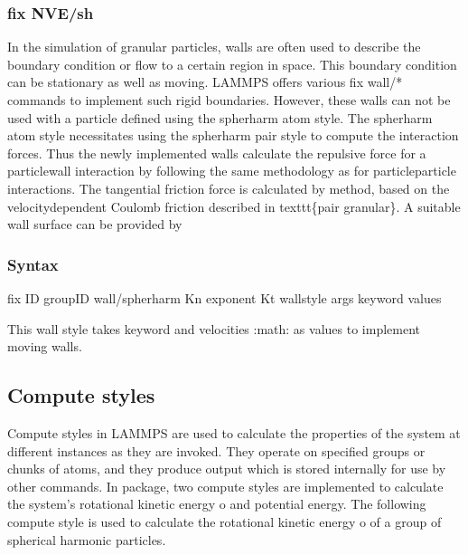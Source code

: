 \documentclass[letterpaper,10pt,english]{sphinxmanual}
\begin{document}
\subsubsection{fix NVE/sh}
\label{\detokenize{Sections/3_implementation:fix-nve-sh}}
\sphinxAtStartPar
In the simulation of granular particles, walls are often used to describe the boundary condition or flow to a certain region in space. This boundary condition can be stationary as well as moving. LAMMPS offers various fix wall/* commands to implement such rigid boundaries. However, these walls can not be used with a particle defined using the spherharm atom style. The spherharm atom style necessitates using the spherharm pair style to compute the interaction forces. Thus the newly implemented walls calculate the repulsive force for a particle\sphinxhyphen{}wall interaction by following the same methodology as for particle\sphinxhyphen{}particle interactions. The tangential friction force is calculated by    method, based on the velocity\sphinxhyphen{}dependent Coulomb friction described in texttt\{pair granular\}.
A suitable wall surface can be  provided by


\subsubsection{Syntax}
\label{\detokenize{Sections/3_implementation:id2}}
\begin{sphinxVerbatim}[commandchars=\\\{\}]
fix ID group\PYGZus{}ID wall/spherharm Kn exponent Kt wallstyle args keyword values
\end{sphinxVerbatim}

\sphinxAtStartPar
This wall style takes  keyword and velocities :math:   as values to implement moving walls.


\subsection{Compute styles}
\label{\detokenize{Sections/3_implementation:compute-styles}}
\sphinxAtStartPar
Compute styles in LAMMPS are used to calculate the properties of the system at different instances as they are invoked. They operate on specified groups or chunks of atoms, and they produce output which is stored internally for use by other commands. In  package, two compute styles are implemented to calculate the system’s rotational kinetic energy o and potential energy. The following compute style is used to calculate the rotational kinetic energy o of a group of spherical harmonic particles.
\end{document}
